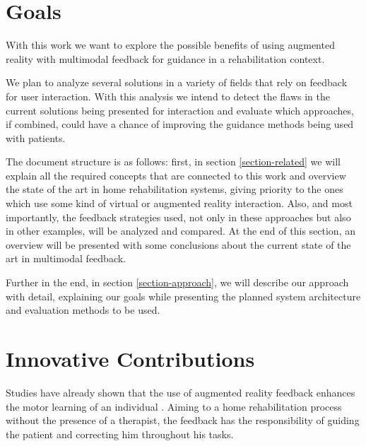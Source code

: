 \section{Goals}

With this work we want to explore the possible benefits of using augmented reality with multimodal 
feedback for guidance in a rehabilitation context.

We plan to analyze several solutions in a variety of fields that rely on feedback for user interaction.
With this analysis we intend to detect the flaws in the current solutions being presented for interaction 
and evaluate which approaches, if combined, could have a chance of improving 
the guidance methods being used with patients.


The document structure is as follows: first, in section \ref{section-related} we will 
explain all the required concepts that are connected to 
this work and overview the state of the art in home rehabilitation systems, giving priority to 
the ones which use some kind of virtual or augmented reality interaction. Also, and most importantly, the feedback strategies used,
not only in these approaches but also in other examples, will be analyzed and compared. 
At the end of this section, an overview will be presented with some conclusions about the current state of the art in multimodal feedback.

Further in the end, in section \ref{section-approach}, we will describe our approach with detail, explaining our goals 
while presenting the planned system architecture and evaluation methods to be used.



\section{Innovative Contributions}

Studies have already shown that the use of augmented reality feedback enhances the motor learning of an individual \cite{Sigrist2013}.
Aiming to a home rehabilitation process without the presence of a therapist,
the feedback has the responsibility of guiding the patient and correcting him throughout his tasks.

